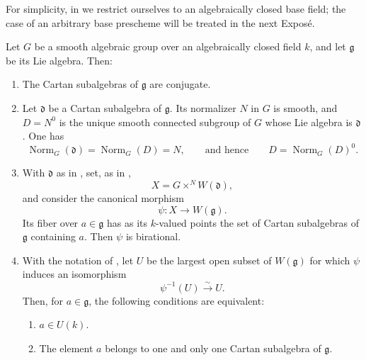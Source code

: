 For simplicity, in  we restrict ourselves to an
algebraically closed base field; the case of an arbitrary base
prescheme will be treated in the next Exposé.

\begin{theorem}
Let \(G\) be a smooth algebraic group over an algebraically closed
field \(k\), and let \(\mathfrak g\) be its Lie algebra. Then:
\begin{enumerate}
  \item[a)]
  The Cartan subalgebras of \(\mathfrak g\) are conjugate.

  \item[b)]
  Let \(\mathfrak d\) be a Cartan subalgebra of \(\mathfrak g\).
  Its normalizer \(N\) in \(G\) is smooth, and \(D=N^0\) is the
  unique smooth connected subgroup of \(G\) whose Lie algebra is
  \(\mathfrak d\). One has
  \[
    \operatorname{Norm}_G(\mathfrak d)
    =\operatorname{Norm}_G(D)
    =N,
    \qquad\text{and hence}\qquad
    D=\operatorname{Norm}_G(D)^0.
  \]

  \item[c)]
  With \(\mathfrak d\) as in , set, as in ,
  \[
    X=G\times^N W(\mathfrak d),
  \]
  and consider the canonical morphism
  \[
    \psi:X\longrightarrow W(\mathfrak g).
  \]
  Its fiber over \(a\in\mathfrak g\) has as its \(k\)-valued points
  the set of Cartan subalgebras of \(\mathfrak g\) containing \(a\).
  Then \(\psi\) is birational.

  \item[d)]
  With the notation of , let \(U\) be the largest open subset of
  \(W(\mathfrak g)\) for which \(\psi\) induces an isomorphism
  \[
    \psi^{-1}(U)\xrightarrow{\sim}U.
  \]
  Then, for \(a\in\mathfrak g\), the following conditions are
  equivalent:
  \begin{enumerate}
    \item[(i)]
    \(a\in U(k)\).

    \item[(ii)]
    The element \(a\) belongs to one and only one Cartan subalgebra of
    \(\mathfrak g\).


\end{enumerate}
\end{enumerate}
\end{theorem}
